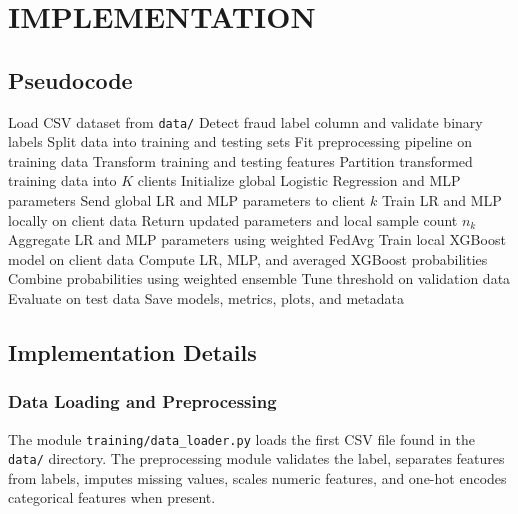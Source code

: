 \chapter{IMPLEMENTATION}
\section{Pseudocode}
\begin{algorithm}[H]
\caption{Federated Ensemble Fraud Detection Training}
\begin{algorithmic}[1]
\State Load CSV dataset from \texttt{data/}
\State Detect fraud label column and validate binary labels
\State Split data into training and testing sets
\State Fit preprocessing pipeline on training data
\State Transform training and testing features
\State Partition transformed training data into $K$ clients
\State Initialize global Logistic Regression and MLP parameters
        \State Send global LR and MLP parameters to client $k$
        \State Train LR and MLP locally on client data
        \State Return updated parameters and local sample count $n_k$
    \EndFor
    \State Aggregate LR and MLP parameters using weighted FedAvg
\EndFor
{}
    \State Train local XGBoost model on client data
\EndFor
\State Compute LR, MLP, and averaged XGBoost probabilities
\State Combine probabilities using weighted ensemble
\State Tune threshold on validation data
\State Evaluate on test data
\State Save models, metrics, plots, and metadata
\end{algorithmic}
\end{algorithm}

\section{Implementation Details}  %
\subsection{Data Loading and Preprocessing}
The module \texttt{training/data\_loader.py} loads the first CSV file found in the \texttt{data/} directory. The preprocessing module validates the label, separates features from labels, imputes missing values, scales numeric features, and one-hot encodes categorical features when present.

